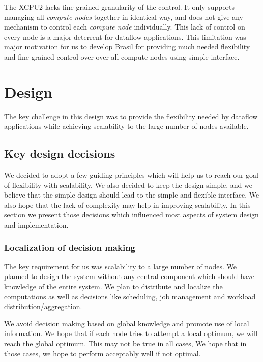 \documentclass[conference]{sig-alternate}
\begin{document}
The XCPU2 lacks fine-grained granularity of the control.  It only supports
managing all \textit{compute nodes} together in identical way, and does not
give any mechanism to control each \textit{compute node} individually.  This
lack of control on every node is a major deterrent for dataflow applications.
This limitation was major motivation for us to develop Brasil for providing much
needed flexibility and fine grained control over over all compute nodes using
simple interface.



\section{Design}

The key challenge in this design was to provide the flexibility needed by
dataflow applications while achieving scalability to the large number of nodes
available. 

\subsection{Key design decisions}

We decided to adopt a few guiding principles which will help us to reach our
goal of flexibility with scalability.  We also decided to keep the design simple,
and we believe that the simple design should lead to the simple and flexible
interface. We also hope that the lack of complexity may help in improving
scalability. In this section we present those decisions which influenced most
aspects of system design and implementation.

\subsubsection{Localization of decision making}
The key requirement for us was scalability to a large number of nodes.  We
planned to design the system without any central component which should have
knowledge of the entire system.  We plan to distribute and localize the
computations as well as decisions like scheduling, job management and
workload distribution/aggregation.

We avoid decision making based on global knowledge and promote use of local
information.  We hope that if each node tries to attempt a local optimum, we
will reach the global optimum.  This may not be true in all cases, We hope
that in those cases, we hope to perform acceptably well if not optimal.
\end{document}
